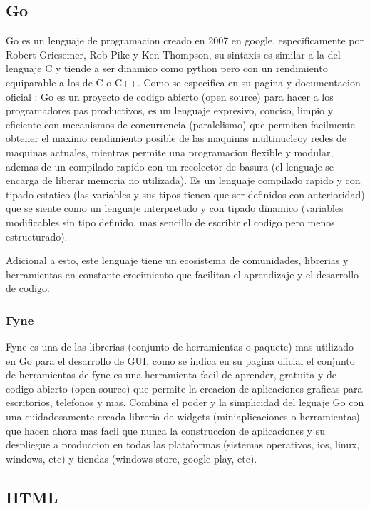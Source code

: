 \subsection{Go}
Go es un lenguaje de programacion creado en 2007 en google, especificamente por
Robert Griesemer, Rob Pike y Ken Thompson, su sintaxis es similar a la del lenguaje
C y tiende a ser dinamico como python pero con un rendimiento equiparable a los
de C o C++. Como se especifica en su pagina y documentacion oficial
\cite{GolangDocumentacion}: Go es un proyecto de codigo abierto (open source)
para hacer a los programadores pas productivos, es un lenguaje expresivo, conciso,
limpio y eficiente con mecanismos de concurrencia (paralelismo) que permiten facilmente
obtener el maximo rendimiento posible de las maquinas multinucleoy redes de maquinas
actuales, mientras permite una programacion flexible y modular, ademas de un compilado
rapido con un recolector de basura (el lenguaje se encarga de liberar memoria
no utilizada).
Es un lenguaje compilado rapido y con tipado estatico (las variables y sus tipos tienen que
ser definidos con anterioridad) que se siente como un lenguaje interpretado y
con tipado dinamico (variables modificables sin tipo definido, mas sencillo de
escribir el codigo pero menos estructurado).

Adicional a esto, este lenguaje tiene un ecosistema de comunidades, librerias y
herramientas en constante crecimiento que facilitan el aprendizaje y el desarrollo
de codigo.

\subsubsection{Fyne}

Fyne es una de las librerias (conjunto de herramientas o paquete) mas utilizado
en Go para el desarrollo de GUI, como se indica en su pagina oficial \cite{fyne}
el conjunto de herramientas de fyne es una herramienta facil de aprender, gratuita
y de codigo abierto (open source) que permite la creacion de aplicaciones graficas
para escritorios, telefonos y mas. Combina el poder y la simplicidad del leguaje
Go con una cuidadosamente creada libreria de widgets (miniaplicaciones o herramientas)
que hacen ahora mas facil que nunca la construccion de aplicaciones y su despliegue
a produccion en todas las plataformas (sistemas operativos, ios, linux, windows, etc)
y tiendas (windows store, google play, etc).

\subsection{HTML}

